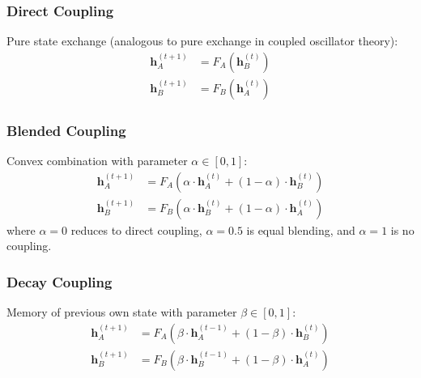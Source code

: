\documentclass[10pt]{article} %
\theoremstyle{plain}
\theoremstyle{definition}
\theoremstyle{remark}
\newcommand{\vect}[1]{\bm{#1}}
\begin{document}
\subsubsection{Direct Coupling}
Pure state exchange (analogous to pure exchange in coupled oscillator theory):
\begin{align}
    \vect{h}_A^{(t+1)} &= F_A(\vect{h}_B^{(t)}) \\
    \vect{h}_B^{(t+1)} &= F_B(\vect{h}_A^{(t)})
\end{align}

\subsubsection{Blended Coupling}
Convex combination with parameter $\alpha \in [0,1]$:
\begin{align}
    \vect{h}_A^{(t+1)} &= F_A(\alpha \cdot \vect{h}_A^{(t)} + (1-\alpha) \cdot \vect{h}_B^{(t)}) \\
    \vect{h}_B^{(t+1)} &= F_B(\alpha \cdot \vect{h}_B^{(t)} + (1-\alpha) \cdot \vect{h}_A^{(t)})
\end{align}
where $\alpha = 0$ reduces to direct coupling, $\alpha = 0.5$ is equal blending, and $\alpha = 1$ is no coupling.

\subsubsection{Decay Coupling}
Memory of previous own state with parameter $\beta \in [0,1]$:
\begin{align}
    \vect{h}_A^{(t+1)} &= F_A(\beta \cdot \vect{h}_A^{(t-1)} + (1-\beta) \cdot \vect{h}_B^{(t)}) \\
    \vect{h}_B^{(t+1)} &= F_B(\beta \cdot \vect{h}_B^{(t-1)} + (1-\beta) \cdot \vect{h}_A^{(t)})
\end{align}
\end{document}
